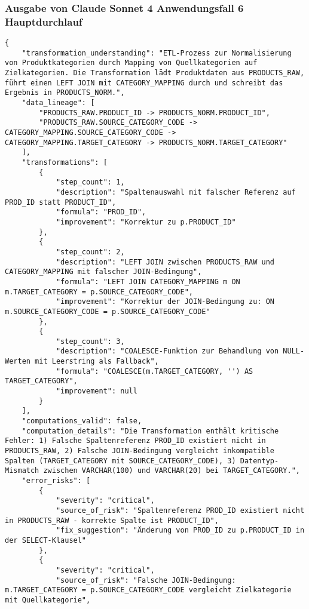 \subsubsection{Ausgabe von Claude Sonnet 4 Anwendungsfall 6 Hauptdurchlauf}\label{anhang:subsubsec:claude_case6_prompt1}
\begin{lstlisting}[caption={Ausgabe: Claude Sonnet 4 Anwendungsfall 6 Hauptdurchlauf},label={claude_case6_prompt1}]
{
    "transformation_understanding": "ETL-Prozess zur Normalisierung von Produktkategorien durch Mapping von Quellkategorien auf Zielkategorien. Die Transformation lädt Produktdaten aus PRODUCTS_RAW, führt einen LEFT JOIN mit CATEGORY_MAPPING durch und schreibt das Ergebnis in PRODUCTS_NORM.",
    "data_lineage": [
        "PRODUCTS_RAW.PRODUCT_ID -> PRODUCTS_NORM.PRODUCT_ID",
        "PRODUCTS_RAW.SOURCE_CATEGORY_CODE -> CATEGORY_MAPPING.SOURCE_CATEGORY_CODE -> CATEGORY_MAPPING.TARGET_CATEGORY -> PRODUCTS_NORM.TARGET_CATEGORY"
    ],
    "transformations": [
        {
            "step_count": 1,
            "description": "Spaltenauswahl mit falscher Referenz auf PROD_ID statt PRODUCT_ID",
            "formula": "PROD_ID",
            "improvement": "Korrektur zu p.PRODUCT_ID"
        },
        {
            "step_count": 2,
            "description": "LEFT JOIN zwischen PRODUCTS_RAW und CATEGORY_MAPPING mit falscher JOIN-Bedingung",
            "formula": "LEFT JOIN CATEGORY_MAPPING m ON m.TARGET_CATEGORY = p.SOURCE_CATEGORY_CODE",
            "improvement": "Korrektur der JOIN-Bedingung zu: ON m.SOURCE_CATEGORY_CODE = p.SOURCE_CATEGORY_CODE"
        },
        {
            "step_count": 3,
            "description": "COALESCE-Funktion zur Behandlung von NULL-Werten mit Leerstring als Fallback",
            "formula": "COALESCE(m.TARGET_CATEGORY, '') AS TARGET_CATEGORY",
            "improvement": null
        }
    ],
    "computations_valid": false,
    "computation_details": "Die Transformation enthält kritische Fehler: 1) Falsche Spaltenreferenz PROD_ID existiert nicht in PRODUCTS_RAW, 2) Falsche JOIN-Bedingung vergleicht inkompatible Spalten (TARGET_CATEGORY mit SOURCE_CATEGORY_CODE), 3) Datentyp-Mismatch zwischen VARCHAR(100) und VARCHAR(20) bei TARGET_CATEGORY.",
    "error_risks": [
        {
            "severity": "critical",
            "source_of_risk": "Spaltenreferenz PROD_ID existiert nicht in PRODUCTS_RAW - korrekte Spalte ist PRODUCT_ID",
            "fix_suggestion": "Änderung von PROD_ID zu p.PRODUCT_ID in der SELECT-Klausel"
        },
        {
            "severity": "critical",
            "source_of_risk": "Falsche JOIN-Bedingung: m.TARGET_CATEGORY = p.SOURCE_CATEGORY_CODE vergleicht Zielkategorie mit Quellkategorie",

\end{lstlisting}
